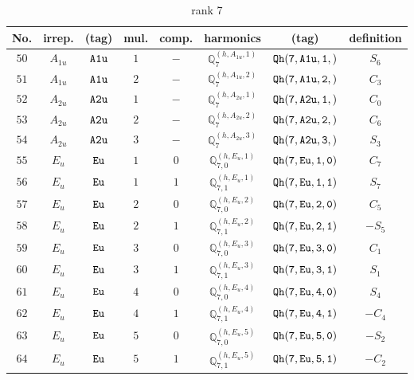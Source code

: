 \documentclass[fleqn,8pt]{jsarticle}
\begin{document}
\begin{table}[ht!]
\begin{center}
\caption{rank 7}
\renewcommand{\arraystretch}{1.3}
\begin{tabular}{cccccccc} \hline \hline
No. & irrep. & (tag) & mul. & comp. & harmonics & (tag) & definition \\ \hline
$ 50 $ & $ A_{1u} $ & $ {\tt A1u} $ & $ 1 $ & $ - $ & $ \mathbb{Q}_{7}^{(h,A_{1u},1)} $ & $ {\tt Qh(7,A1u,1,)} $ & $ S_{6} $ \\
$ 51 $ & $ A_{1u} $ & $ {\tt A1u} $ & $ 2 $ & $ - $ & $ \mathbb{Q}_{7}^{(h,A_{1u},2)} $ & $ {\tt Qh(7,A1u,2,)} $ & $ C_{3} $ \\
$ 52 $ & $ A_{2u} $ & $ {\tt A2u} $ & $ 1 $ & $ - $ & $ \mathbb{Q}_{7}^{(h,A_{2u},1)} $ & $ {\tt Qh(7,A2u,1,)} $ & $ C_{0} $ \\
$ 53 $ & $ A_{2u} $ & $ {\tt A2u} $ & $ 2 $ & $ - $ & $ \mathbb{Q}_{7}^{(h,A_{2u},2)} $ & $ {\tt Qh(7,A2u,2,)} $ & $ C_{6} $ \\
$ 54 $ & $ A_{2u} $ & $ {\tt A2u} $ & $ 3 $ & $ - $ & $ \mathbb{Q}_{7}^{(h,A_{2u},3)} $ & $ {\tt Qh(7,A2u,3,)} $ & $ S_{3} $ \\
$ 55 $ & $ E_{u} $ & $ {\tt Eu} $ & $ 1 $ & $ 0 $ & $ \mathbb{Q}_{7,0}^{(h,E_{u},1)} $ & $ {\tt Qh(7,Eu,1,0)} $ & $ C_{7} $ \\
$ 56 $ & $ E_{u} $ & $ {\tt Eu} $ & $ 1 $ & $ 1 $ & $ \mathbb{Q}_{7,1}^{(h,E_{u},1)} $ & $ {\tt Qh(7,Eu,1,1)} $ & $ S_{7} $ \\
$ 57 $ & $ E_{u} $ & $ {\tt Eu} $ & $ 2 $ & $ 0 $ & $ \mathbb{Q}_{7,0}^{(h,E_{u},2)} $ & $ {\tt Qh(7,Eu,2,0)} $ & $ C_{5} $ \\
$ 58 $ & $ E_{u} $ & $ {\tt Eu} $ & $ 2 $ & $ 1 $ & $ \mathbb{Q}_{7,1}^{(h,E_{u},2)} $ & $ {\tt Qh(7,Eu,2,1)} $ & $ - S_{5} $ \\
$ 59 $ & $ E_{u} $ & $ {\tt Eu} $ & $ 3 $ & $ 0 $ & $ \mathbb{Q}_{7,0}^{(h,E_{u},3)} $ & $ {\tt Qh(7,Eu,3,0)} $ & $ C_{1} $ \\
$ 60 $ & $ E_{u} $ & $ {\tt Eu} $ & $ 3 $ & $ 1 $ & $ \mathbb{Q}_{7,1}^{(h,E_{u},3)} $ & $ {\tt Qh(7,Eu,3,1)} $ & $ S_{1} $ \\
$ 61 $ & $ E_{u} $ & $ {\tt Eu} $ & $ 4 $ & $ 0 $ & $ \mathbb{Q}_{7,0}^{(h,E_{u},4)} $ & $ {\tt Qh(7,Eu,4,0)} $ & $ S_{4} $ \\
$ 62 $ & $ E_{u} $ & $ {\tt Eu} $ & $ 4 $ & $ 1 $ & $ \mathbb{Q}_{7,1}^{(h,E_{u},4)} $ & $ {\tt Qh(7,Eu,4,1)} $ & $ - C_{4} $ \\
$ 63 $ & $ E_{u} $ & $ {\tt Eu} $ & $ 5 $ & $ 0 $ & $ \mathbb{Q}_{7,0}^{(h,E_{u},5)} $ & $ {\tt Qh(7,Eu,5,0)} $ & $ - S_{2} $ \\
$ 64 $ & $ E_{u} $ & $ {\tt Eu} $ & $ 5 $ & $ 1 $ & $ \mathbb{Q}_{7,1}^{(h,E_{u},5)} $ & $ {\tt Qh(7,Eu,5,1)} $ & $ - C_{2} $ \\
 \hline \hline
\end{tabular}
\end{center}
\end{table}
\end{document}
